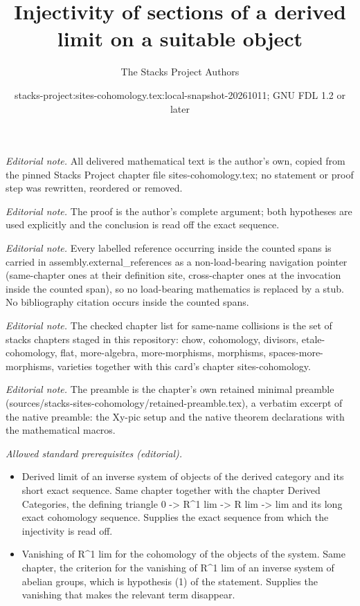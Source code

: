 \documentclass[10pt,a4paper]{amsart}
\title{Injectivity of sections of a derived limit on a suitable object}
\author{The Stacks Project Authors}
\date{stacks-project:sites-cohomology.tex:local-snapshot-20261011; GNU FDL 1.2 or later}
\theoremstyle{plain}
\theoremstyle{definition}
\theoremstyle{remark}
\numberwithin{equation}{subsection}
\begin{document}
\maketitle
\noindent\textit{Editorial note.} All delivered mathematical text is the author's own, copied from the pinned Stacks Project chapter file sites-cohomology.tex; no statement or proof step was rewritten, reordered or removed.\par\medskip
\noindent\textit{Editorial note.} The proof is the author's complete argument; both hypotheses are used explicitly and the conclusion is read off the exact sequence.\par\medskip
\noindent\textit{Editorial note.} Every labelled reference occurring inside the counted spans is carried in assembly.external\_references as a non-load-bearing navigation pointer (same-chapter ones at their definition site, cross-chapter ones at the invocation inside the counted span), so no load-bearing mathematics is replaced by a stub. No bibliography citation occurs inside the counted spans.\par\medskip
\noindent\textit{Editorial note.} The checked chapter list for same-name collisions is the set of stacks chapters staged in this repository: chow, cohomology, divisors, etale-cohomology, flat, more-algebra, more-morphisms, morphisms, spaces-more-morphisms, varieties together with this card's chapter sites-cohomology.\par\medskip
\noindent\textit{Editorial note.} The preamble is the chapter's own retained minimal preamble (sources/stacks-sites-cohomology/retained-preamble.tex), a verbatim excerpt of the native preamble: the Xy-pic setup and the native theorem declarations with the mathematical macros.\par\medskip
\noindent\textit{Allowed standard prerequisites (editorial).}\begin{itemize}
\item Derived limit of an inverse system of objects of the derived category and its short exact sequence. Same chapter together with the chapter Derived Categories, the defining triangle 0 -> R\textasciicircum{}1 lim -> R lim -> lim and its long exact cohomology sequence. Supplies the exact sequence from which the injectivity is read off.
\item Vanishing of R\textasciicircum{}1 lim for the cohomology of the objects of the system. Same chapter, the criterion for the vanishing of R\textasciicircum{}1 lim of an inverse system of abelian groups, which is hypothesis (1) of the statement. Supplies the vanishing that makes the relevant term disappear.
\end{itemize}\medskip
\end{document}
